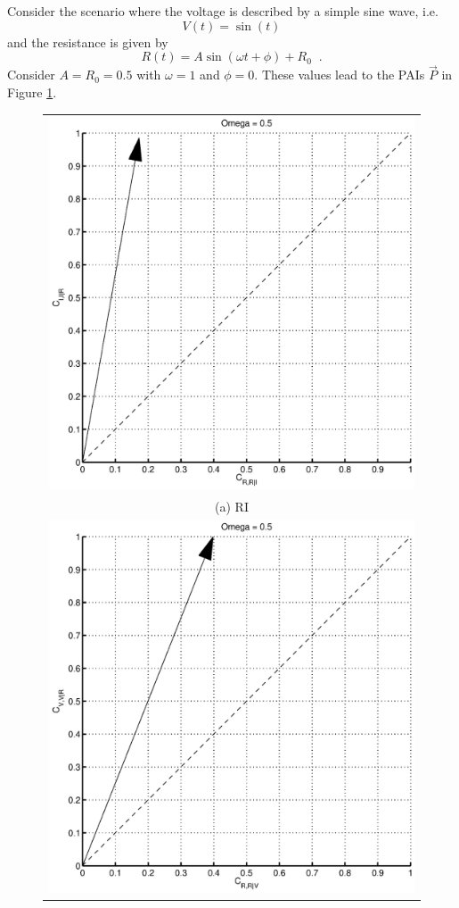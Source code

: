 \documentclass[a4paper,11pt]{article}
\begin{document}
Consider the scenario where the voltage is described by a simple sine wave, i.e.\
\begin{equation}
\label{eqn:vt}
V(t) = \sin(t)
\end{equation}
and the resistance is given by
\begin{equation}
\label{eqn:rt}
R(t) = A\sin(\omega t + \phi) + R_0\;\;.
\end{equation}
Consider $A=R_0=0.5$ with $\omega=1$ and $\phi=0$.  These values lead to the PAIs $\vec{P}$ in Figure \ref{fig:}.  
\begin{figure}[ht]
\label{fig:}
\begin{tabular}{c}
\includegraphics[scale=0.45]{Figure4A.eps} \\
(a) RI \\[6pt]
\includegraphics[scale=0.45]{Figure4B.eps}\\

\end{tabular}
\end{figure}
\end{document}
